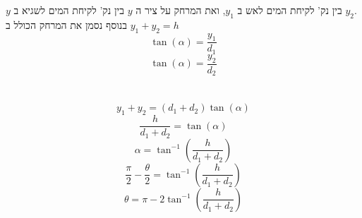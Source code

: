 \documentclass{article}
\begin{document}
$y$ 
בין נק' לקיחת המים לאש ב
$y_1$,
ואת המרחק על ציר ה
$y$
בין נק' לקיחת המים לשגיא ב
$y_2$.\\
בנוסף נסמן את המרחק הכולל ב
$y_1+y_2 = h$
\begin{equation*}
    \tan (\alpha) = \frac{y_1}{d_1}
\end{equation*}
\begin{equation*}
    \tan (\alpha) = \frac{y_2}{d_2}
\end{equation*}
\\
\\
\begin{equation*}
    y_1 + y_2 = (d_1 + d_2)\tan (\alpha) 
\end{equation*}
\begin{equation*}
    \frac{h}{d_1 + d_2} = \tan (\alpha) 
\end{equation*}
\begin{equation*}
    \alpha = \tan ^ {-1} \left( \frac{h}{d_1 + d_2} \right)
\end{equation*}
\begin{equation*}
    \frac{\pi}{2} - \frac{\theta}{2} = \tan ^ {-1}\left( \frac{h}{d_1 + d_2} \right)
\end{equation*}
\begin{equation*}
    \theta = \pi - 2\tan ^ {-1} \left( \frac{h}{d_1 + d_2} \right)
\end{equation*}


\newpage
\end{document}
